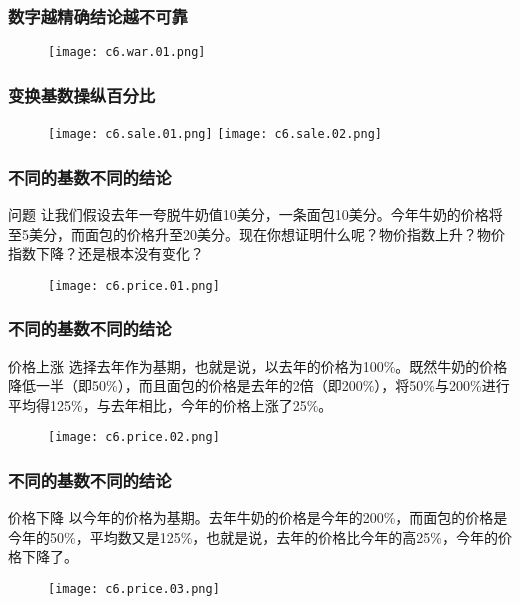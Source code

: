 \begin{frame}
  \frametitle{数字越精确结论越不可靠}
  \begin{figure}
    \centering
    \texttt{[image: c6.war.01.png]}
  \end{figure}
\end{frame}

\begin{frame}
  \frametitle{变换基数操纵百分比}
  \begin{figure}
    \centering
    \texttt{[image: c6.sale.01.png]}\quad
    \texttt{[image: c6.sale.02.png]}
  \end{figure}
\end{frame}

\begin{frame}
  \frametitle{不同的基数不同的结论}
  \begin{block}{问题}
让我们假设去年一夸脱牛奶值10美分，一条面包10美分。今年牛奶的价格将至5美分，而面包的价格升至20美分。现在你想证明什么呢？物价指数上升？物价指数下降？还是根本没有变化？
  \end{block}
  \begin{figure}
    \centering
    \texttt{[image: c6.price.01.png]}
  \end{figure}
\end{frame}

\begin{frame}
  \frametitle{不同的基数不同的结论}
  \begin{block}{价格上涨}
 选择去年作为基期，也就是说，以去年的价格为100\%。既然牛奶的价格降低一半（即50\%），而且面包的价格是去年的2倍（即200\%），将50\%与200\%进行平均得125\%，与去年相比，今年的价格上涨了25\%。
  \end{block}
  \begin{figure}
    \centering
    \texttt{[image: c6.price.02.png]}
  \end{figure}
\end{frame}

\begin{frame}
  \frametitle{不同的基数不同的结论}
  \begin{block}{价格下降}
 以今年的价格为基期。去年牛奶的价格是今年的200\%，而面包的价格是今年的50\%，平均数又是125\%，也就是说，去年的价格比今年的高25\%，今年的价格下降了。
  \end{block}
  \begin{figure}
    \centering
    \texttt{[image: c6.price.03.png]}
  \end{figure}
\end{frame}

